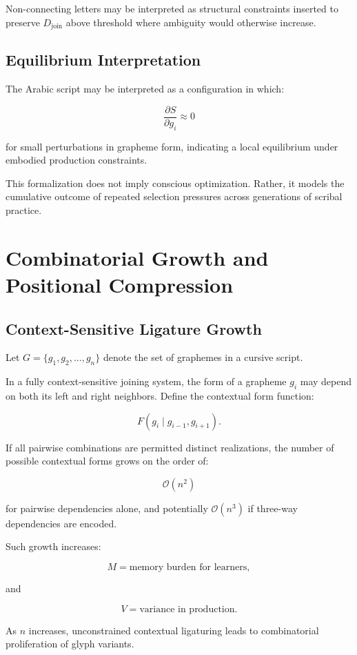 \documentclass[11pt]{article}
\begin{document}
Non-connecting letters may be interpreted as structural constraints inserted to preserve $D_{\text{join}}$ above threshold where ambiguity would otherwise increase.

\subsection{Equilibrium Interpretation}

The Arabic script may be interpreted as a configuration in which:

\[
\frac{\partial S}{\partial g_i} \approx 0
\]

for small perturbations in grapheme form, indicating a local equilibrium under embodied production constraints.

This formalization does not imply conscious optimization. Rather, it models the cumulative outcome of repeated selection pressures across generations of scribal practice.

\section{Combinatorial Growth and Positional Compression}

\subsection{Context-Sensitive Ligature Growth}

Let $G = \{g_1, g_2, \dots, g_n\}$ denote the set of graphemes in a cursive script.

In a fully context-sensitive joining system, the form of a grapheme $g_i$ may depend on both its left and right neighbors. Define the contextual form function:

\[
F(g_i \mid g_{i-1}, g_{i+1}).
\]

If all pairwise combinations are permitted distinct realizations, the number of possible contextual forms grows on the order of:

\[
\mathcal{O}(n^2)
\]

for pairwise dependencies alone, and potentially $\mathcal{O}(n^3)$ if three-way dependencies are encoded.

Such growth increases:

\[
M = \text{memory burden for learners},
\]

and

\[
V = \text{variance in production}.
\]

As $n$ increases, unconstrained contextual ligaturing leads to combinatorial proliferation of glyph variants.
\end{document}

